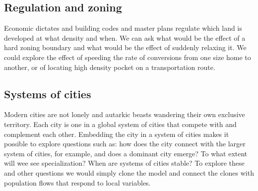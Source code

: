 
\subsection{Regulation and zoning}
Economic dictates and building codes and master plans regulate which land is developed at what density and when. We can ask what would be the effect of a hard zoning boundary and what would be the effect of suddenly relaxing it. We could explore the effect of speeding the rate of conversions from one size  home to another, or of locating high density pocket on a transportation route. %

\subsection{Systems of cities}
Modern cities are not lonely and autarkic beasts wandering their own exclusive territory. Each city is one in a global system of cities that compete with and complement each other. 
Embedding the city in a system of cities makes it possible to explore questions such as: %
how does the city connect with the larger system of cities, for example, and does a dominant city emerge? To what extent will wee see specialization? When are systems of cities stable? To explore these and other questions we would simply clone the model and connect the clones with population flows that respond to local variables.


